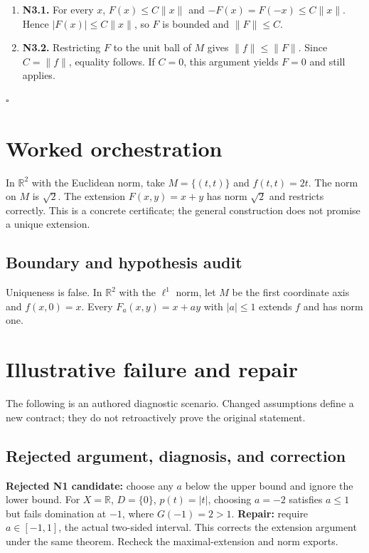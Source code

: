 \documentclass[preprint,12pt,aps,pra,showkeys,amsmath,amssymb,superscriptaddress,floatfix]{revtex4-2}
\theoremstyle{definition}
\theoremstyle{remark}
\begin{document}
\begin{enumerate}
\def\labelenumi{\arabic{enumi}.}
\item
  \textbf{N3.1.} For every \(x\), \(F(x)\le C\|x\|\) and
  \(-F(x)=F(-x)\le C\|x\|\). Hence \(|F(x)|\le C\|x\|\), so \(F\) is
  bounded and \(\|F\|\le C\).
\item
  \textbf{N3.2.} Restricting \(F\) to the unit ball of \(M\) gives
  \(\|f\|\le\|F\|\). Since \(C=\|f\|\), equality follows. If \(C=0\),
  this argument yields \(F=0\) and still applies.
\end{enumerate}

\hfill$\square$

\section{Worked orchestration}

In \(\mathbb R^2\) with the Euclidean norm, take \(M=\{(t,t)\}\) and
\(f(t,t)=2t\). The norm on \(M\) is \(\sqrt2\). The extension
\(F(x,y)=x+y\) has norm \(\sqrt2\) and restricts correctly. This is a
concrete certificate; the general construction does not promise a unique
extension.

\subsection{Boundary and hypothesis audit}

Uniqueness is false. In \(\mathbb R^2\) with the \(\ell^1\) norm, let
\(M\) be the first coordinate axis and \(f(x,0)=x\). Every
\(F_a(x,y)=x+ay\) with \(|a|\le1\) extends \(f\) and has norm one.

\section{Illustrative failure and repair}

The following is an authored diagnostic scenario. Changed assumptions
define a new contract; they do not retroactively prove the original
statement.

\subsection{Rejected argument, diagnosis, and correction}
\textbf{Rejected N1 candidate:} choose any \(a\) below the upper bound
and ignore the lower bound. For \(X=\mathbb R\), \(D=\{0\}\),
\(p(t)=|t|\), choosing \(a=-2\) satisfies \(a\le1\) but fails domination
at \(-1\), where \(G(-1)=2>1\). \textbf{Repair:} require \(a\in[-1,1]\),
the actual two-sided interval. This corrects the extension argument
under the same theorem. Recheck the maximal-extension and norm exports.
\end{document}
